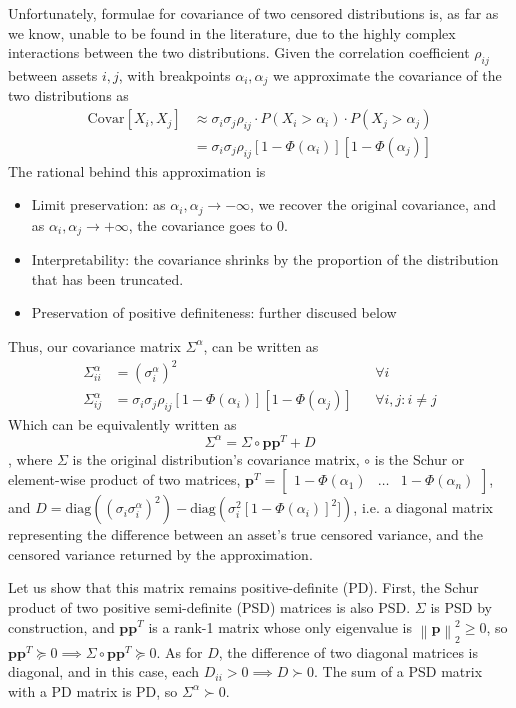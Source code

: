 \documentclass[11pt]{article}
\newcommand{\te}{\text}
\newcommand{\lp}{\left(}
\newcommand{\rp}{\right)}
\renewcommand{\a}{\alpha}
\renewcommand{\P}{\Phi}
\newcommand{\norm}[1]{\left\lVert#1\right\rVert}
\begin{document}
Unfortunately, formulae for covariance of two censored distributions is, as far as we know, unable to be found in the literature, due to the highly complex interactions between the two distributions. Given the correlation coefficient $\rho_{ij}$ between assets $i, j$, with breakpoints $\a_i, \a_j$ we approximate the covariance of the two distributions as
\begin{equation}\label{eq:covar}
\begin{aligned}
\text{Covar}[X_i, X_j] &\approx \sigma_i\sigma_j\rho_{ij}\cdot P(X_i>\alpha_i)\cdot P(X_j>\a_j) \\
    &=\sigma_i\sigma_j\rho_{ij}[1-\P(\a_i)][1-\P(\a_j)]
\end{aligned}
\end{equation}
The rational behind this approximation is 
\begin{itemize}
    \item Limit preservation: as $\a_i, \a_j \to -\infty$, we recover the original covariance, and as $\a_i, \a_j \to +\infty $, the covariance goes to 0. 
    \item Interpretability: the covariance shrinks by the proportion of the distribution that has been truncated.
    \item Preservation of positive definiteness: further discused below
\end{itemize}
Thus, our covariance matrix $\Sigma^\a$, can be written as 
\[
\begin{aligned}
    \Sigma^\a_{ii} &= (\sigma_i^\a)^2 &&\forall i \\
    \Sigma^\a_{ij} &= \sigma_i\sigma_j\rho_{ij}[1-\P(\a_i)][1-\P(\a_j)] &&\forall i, j: i\neq j
\end{aligned}
\]
Which can be equivalently written as 
\[
\Sigma^\a = \Sigma\circ \mathbf{p}\mathbf{p}^T +D
\]
, where $\Sigma$ is the original distribution's covariance matrix, $\circ$ is the Schur or element-wise product of two matrices, $\mathbf{p}^T = \begin{bmatrix}
    1-\Phi(\a_1)  &
    \hdots &
    1-\Phi(\a_n)
\end{bmatrix}$, and $D=\te{diag}\lp \lp\sigma_i\sigma_{i}^\alpha \rp ^2 \rp - \te{diag}\lp\sigma_i^2[1-\P(\a_i)]^2]\rp$, i.e. a diagonal matrix representing the difference between an asset's true censored variance, and the censored variance returned by the approximation.

Let us show that this matrix remains positive-definite (PD). First, the Schur product of two positive semi-definite (PSD) matrices is also PSD. $\Sigma$ is PSD by construction, and $\mathbf{p}\mathbf{p}^T$ is a rank-1 matrix whose only eigenvalue is $\norm{\mathbf{p}}_2^2 \geq 0$, so $\mathbf{p}\mathbf{p}^T \succeq 0\implies \Sigma \circ \mathbf{p}\mathbf{p}^T \succeq 0$. As for $D$, the difference of two diagonal matrices is diagonal, and in this case, each $D_{ii} >0 \implies D\succ 0$. The sum of a PSD matrix with a PD matrix is PD, so $\Sigma^\a \succ 0$.
\end{document}
